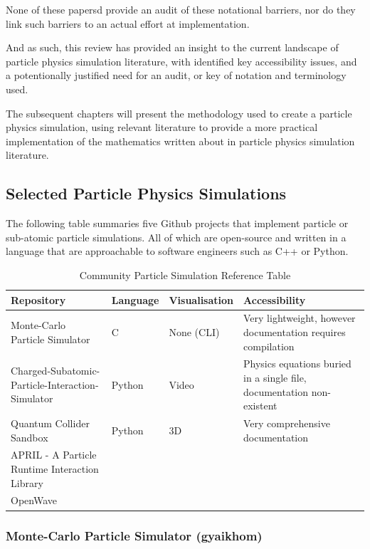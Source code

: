 None of these papersd provide an audit of these notational barriers, nor do they link such barriers to an actual effort at implementation.

And as such, this review has provided an insight to the current landscape of particle physics simulation literature, with identified key accessibility issues, and a potentionally justified need for
an audit, or key of notation and terminology used.

The subsequent chapters will present the methodology used to create a particle physics simulation, using relevant literature to provide a more practical implementation of the mathematics written about
in particle physics simulation literature.

\subsection{Selected Particle Physics Simulations}

The following table summaries five Github projects that implement particle or sub-atomic particle simulations.
All of which are open-source and written in a language that are approachable to software engineers such as C++ or Python.

\begin{table}[ht]
    \centering
    \caption{Community Particle Simulation Reference Table}
    \label{tab:community-sims}
    \begin{tabularx}{\textwidth}{@{} L l l L @{}}
        \toprule
        Repository & Language & Visualisation & Accessibility \\
        \midrule
        Monte-Carlo Particle Simulator & C & None (CLI) & Very lightweight, however documentation requires compilation \\
        \addlinespace
        Charged-Subatomic-Particle-Interaction-Simulator & Python & Video & Physics equations buried in a single file, documentation non-existent \\
        \addlinespace
        Quantum Collider Sandbox & Python & 3D & Very comprehensive documentation \\
        \addlinespace
        APRIL \-- A Particle Runtime Interaction Library &  & &  \\
        \addlinespace
        OpenWave &  &  &  \\
        \bottomrule
    \end{tabularx}
\end{table}

\subsubsection*{Monte-Carlo Particle Simulator (gyaikhom)}

